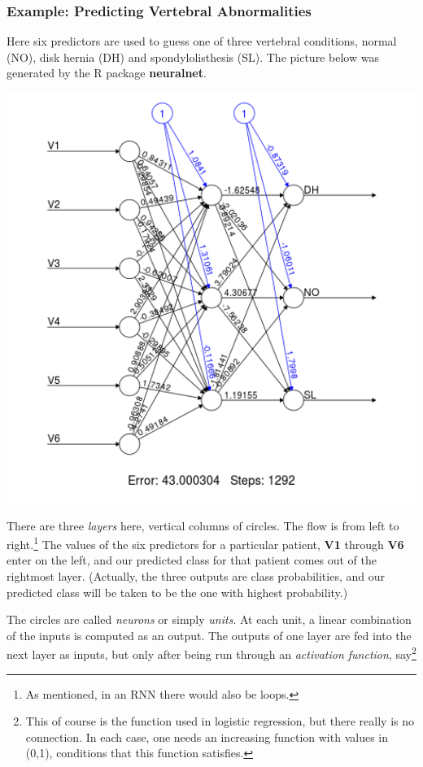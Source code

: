 \subsubsection{Example: Predicting Vertebral Abnormalities}

Here six predictors are used to guess one of three vertebral conditions,
normal (NO), disk hernia (DH) and spondylolisthesis (SL).  The picture
below was generated by the R package \textbf{neuralnet}.

\includegraphics[width=5.6in]{Images/VertebraeNN.png} 

There are three \textit{layers} here, vertical columns of circles.  
The flow is from left to right.\footnote{As mentioned, in an RNN there
would also be loops.}  The values of the six predictors for a particular
patient, \textbf{V1} through \textbf{V6} enter on the left, and our
predicted class for that patient comes out of the rightmost layer.
(Actually, the three outputs are class probabilities, and our predicted
class will be taken to be the one with highest probability.)

The circles are called \textit{neurons} or simply \textit{units}.  At
each unit, a linear combination of the inputs is computed as an output.
The outputs of one layer are fed into the next layer as inputs, but only
after being run through an \textit{activation function},
say\footnote{This of course is the function used in logistic regression,
but there really is no connection.  In each case, one needs an
increasing function with values in (0,1), conditions that this function
satisfies.}

